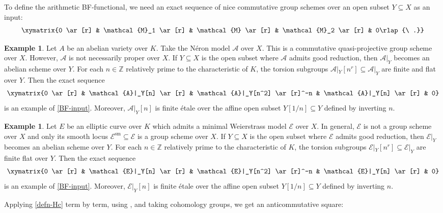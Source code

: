 \documentclass[a4paper]{amsart}
\theoremstyle{definition}
\newtheorem{ex}[thm]{Example}
\numberwithin{equation}{section}
\begin{document}
To define the arithmetic BF-functional, we need an exact sequence of nice commutative group schemes over an open subset $Y\subseteq X$ as an input:
\begin{align}\label{BF-input}
    \xymatrix{0 \ar[r] & \mathcal{M}_1 \ar[r] & \mathcal{M} \ar[r] & \mathcal{M}_2 \ar[r] & 0\rlap{\ .}}
\end{align}
\begin{ex} Let $A$ be an abelian variety over $K$. Take the N\'eron model $\mathcal{A}$ over $X$. This is a commutative quasi-projective group scheme over $X$. However, $\mathcal{A}$ is not necessarily proper over $X$. If $Y\subseteq X$ is the open subset where $\mathcal{A}$ admits good reduction, then $\mathcal{A}|_Y$ becomes an abelian scheme over $Y$. For each $n\in\mathbb{Z}$ relatively prime to the characteristic of $K$, the torsion subgroups $\mathcal{A}|_Y[n^r]\subseteq\mathcal{A}|_Y$ are finite and flat over $Y$. Then the exact sequence
\begin{align*}
    \xymatrix{0 \ar[r] & \mathcal{A}|_Y[n] \ar[r] & \mathcal{A}|_Y[n^2] \ar[r]^-n & \mathcal{A}|_Y[n] \ar[r] & 0}
\end{align*}
is an example of \eqref{BF-input}. Moreover, $\mathcal{A}|_Y[n]$ is finite \'etale over the affine open subset $Y[1/n]\subseteq Y$ defined by inverting $n$.
\end{ex}
\begin{ex} Let $E$ be an elliptic curve over $K$ which admits a minimal Weierstrass model $\mathcal{E}$ over $X$. In general, $\mathcal{E}$ is not a group scheme over $X$ and only its smooth locus $\mathcal{E}^\mathrm{sm}\subseteq\mathcal{E}$ is a group scheme over $X$. If $Y\subseteq X$ is the open subset where $\mathcal{E}$ admits good reduction, then $\mathcal{E}|_Y$ becomes an abelian scheme over $Y$. For each $n\in\mathbb{Z}$ relatively prime to the characteristic of $K$, the torsion subgroups $\mathcal{E}|_Y[n^r]\subseteq\mathcal{E}|_Y$ are finite flat over $Y$. Then the exact sequence
\begin{align*}
    \xymatrix{0 \ar[r] & \mathcal{E}|_Y[n] \ar[r] & \mathcal{E}|_Y[n^2] \ar[r]^-n & \mathcal{E}|_Y[n] \ar[r] & 0}
\end{align*}
is an example of \eqref{BF-input}. Moreover, $\mathcal{E}|_Y[n]$ is finite \'etale over the affine open subset $Y[1/n]\subseteq Y$ defined by inverting $n$.
\end{ex}
Applying \eqref{defn-Hc} term by term, using \cite[\href{https://stacks.math.columbia.edu/tag/05R0}{Tag 05R0}]{Stacks}, and taking cohomology groups, we get an anticommutative square:
\end{document}
